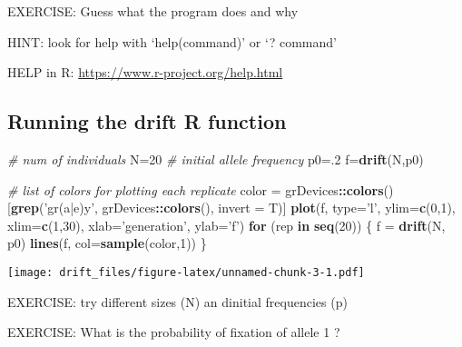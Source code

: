 \documentclass[]{article}
\newenvironment{Shaded}{\begin{snugshade}}{\end{snugshade}}
\newcommand{\KeywordTok}[1]{\textcolor[rgb]{0.13,0.29,0.53}{\textbf{#1}}}
\newcommand{\DataTypeTok}[1]{\textcolor[rgb]{0.13,0.29,0.53}{#1}}
\newcommand{\DecValTok}[1]{\textcolor[rgb]{0.00,0.00,0.81}{#1}}
\newcommand{\StringTok}[1]{\textcolor[rgb]{0.31,0.60,0.02}{#1}}
\newcommand{\CommentTok}[1]{\textcolor[rgb]{0.56,0.35,0.01}{\textit{#1}}}
\newcommand{\ControlFlowTok}[1]{\textcolor[rgb]{0.13,0.29,0.53}{\textbf{#1}}}
\newcommand{\OperatorTok}[1]{\textcolor[rgb]{0.81,0.36,0.00}{\textbf{#1}}}
\newcommand{\NormalTok}[1]{#1}
\begin{document}
EXERCISE: Guess what the program does and why

HINT: look for help with `help(command)' or `? command'

HELP in R: \url{https://www.r-project.org/help.html}

\subsection{Running the drift R
function}\label{running-the-drift-r-function}

\begin{Shaded}
\begin{Highlighting}[]
\CommentTok{# num of individuals}
\NormalTok{N=}\DecValTok{20}
\CommentTok{# initial allele frequency}
\NormalTok{p0=.}\DecValTok{2}
\NormalTok{f=}\KeywordTok{drift}\NormalTok{(N,p0)}
\end{Highlighting}
\end{Shaded}

\begin{Shaded}
\begin{Highlighting}[]
\CommentTok{# list of colors for plotting each replicate}
\NormalTok{color =}\StringTok{ }\NormalTok{grDevices}\OperatorTok{::}\KeywordTok{colors}\NormalTok{()[}\KeywordTok{grep}\NormalTok{(}\StringTok{'gr(a|e)y'}\NormalTok{, grDevices}\OperatorTok{::}\KeywordTok{colors}\NormalTok{(), }\DataTypeTok{invert =}\NormalTok{ T)]}
\KeywordTok{plot}\NormalTok{(f, }\DataTypeTok{type=}\StringTok{'l'}\NormalTok{, }\DataTypeTok{ylim=}\KeywordTok{c}\NormalTok{(}\DecValTok{0}\NormalTok{,}\DecValTok{1}\NormalTok{), }\DataTypeTok{xlim=}\KeywordTok{c}\NormalTok{(}\DecValTok{1}\NormalTok{,}\DecValTok{30}\NormalTok{), }\DataTypeTok{xlab=}\StringTok{'generation'}\NormalTok{, }\DataTypeTok{ylab=}\StringTok{'f'}\NormalTok{)}
\ControlFlowTok{for}\NormalTok{ (rep }\ControlFlowTok{in} \KeywordTok{seq}\NormalTok{(}\DecValTok{20}\NormalTok{)) \{}
\NormalTok{    f =}\StringTok{ }\KeywordTok{drift}\NormalTok{(N, p0)}
    \KeywordTok{lines}\NormalTok{(f, }\DataTypeTok{col=}\KeywordTok{sample}\NormalTok{(color,}\DecValTok{1}\NormalTok{))}
\NormalTok{\}}
\end{Highlighting}
\end{Shaded}

\texttt{[image: drift\_files/figure-latex/unnamed-chunk-3-1.pdf]}

EXERCISE: try different sizes (N) an dinitial frequencies (p)

EXERCISE: What is the probability of fixation of allele 1 ?
\end{document}
